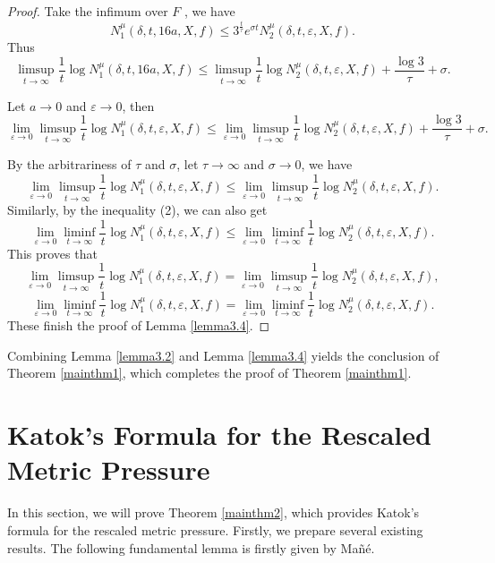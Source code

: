 \documentclass[10pt]{article}
\newtheorem*{Theorem A}{Theorem A}
\begin{document}
\begin{proof}
Take the infimum over \( F \) , we have
\[
N_1^\mu(\delta, t, 16a, X, f) \leq 3^{\frac{t}{\tau}} e^{\sigma t} N_2^\mu(\delta, t, \varepsilon, X, f). \tag{2}
\]
\noindent
Thus
\[
\limsup_{t \to \infty} \frac{1}{t} \log N_1^\mu(\delta, t, 16a, X, f) \leq \limsup_{t \to \infty} \frac{1}{t} \log N_2^\mu(\delta, t, \varepsilon, X, f) + \frac{\log 3}{\tau} + \sigma.
\]

\noindent
Let \( a \to 0 \) and \( \varepsilon \to 0 \), then
\[
\lim_{\varepsilon \to 0} \limsup_{t \to \infty} \frac{1}{t} \log N_1^\mu(\delta, t, \varepsilon, X, f) \leq \lim_{\varepsilon \to 0} \limsup_{t \to \infty} \frac{1}{t} \log N_2^\mu(\delta, t, \varepsilon, X, f) + \frac{\log 3}{\tau} + \sigma.
\]

\noindent
By the arbitrariness of \( \tau \) and \( \sigma \), let \( \tau \to \infty \) and \( \sigma \to 0 \), we have
\[
\lim_{\varepsilon \to 0} \limsup_{t \to \infty} \frac{1}{t} \log N_1^\mu(\delta, t, \varepsilon, X, f) \leq \lim_{\varepsilon \to 0} \limsup_{t \to \infty} \frac{1}{t} \log N_2^\mu(\delta, t, \varepsilon, X, f).
\]
Similarly, by the inequality (2), we can also get
\[
\lim_{\varepsilon \to 0} \liminf_{t \to \infty} \frac{1}{t} \log N_1^\mu(\delta, t, \varepsilon, X, f) \leq \lim_{\varepsilon \to 0} \liminf_{t \to \infty} \frac{1}{t} \log N_2^\mu(\delta, t, \varepsilon, X, f).
\]
\noindent
This proves that
\[
\lim_{\varepsilon \to 0} \limsup_{t \to \infty} \frac{1}{t} \log N_1^\mu(\delta, t, \varepsilon, X, f) = \lim_{\varepsilon \to 0} \limsup_{t \to \infty} \frac{1}{t} \log N_2^\mu(\delta, t, \varepsilon, X, f),
\]
\[
\lim_{\varepsilon \to 0} \liminf_{t \to \infty} \frac{1}{t} \log N_1^\mu(\delta, t, \varepsilon, X, f) = \lim_{\varepsilon \to 0} \liminf_{t \to \infty} \frac{1}{t} \log N_2^\mu(\delta, t, \varepsilon, X, f).
\]
These finish the proof of Lemma \ref{lemma3.4}.
\end{proof}


Combining Lemma \ref{lemma3.2} and Lemma \ref{lemma3.4} yields the conclusion of Theorem \ref{mainthm1}, which completes the proof of Theorem \ref{mainthm1}.

\section{Katok's Formula for the Rescaled Metric Pressure}\label{sec:Katokformula}
In this section, we will prove Theorem \ref{mainthm2}, which provides Katok's formula for the rescaled metric pressure. Firstly, we prepare several existing results. The following fundamental lemma is firstly given by Ma\~n\'e.
\end{document}
